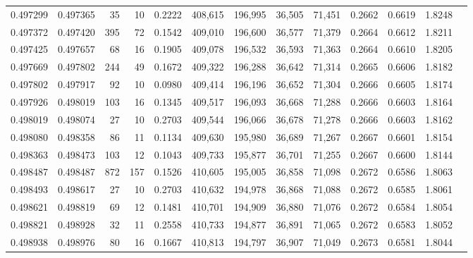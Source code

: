 \begin{tabular}{rrrrrrrrrrrrr}
0.497299 & 0.497365 &    35 &  10 &                                     0.2222 & 408,615 & 196,995 &  36,505 &  71,451 & 0.2662 & 0.6619 & 1.8248 \\
0.497372 & 0.497420 &   395 &  72 &                                     0.1542 & 409,010 & 196,600 &  36,577 &  71,379 & 0.2664 & 0.6612 & 1.8211 \\
0.497425 & 0.497657 &    68 &  16 &                                     0.1905 & 409,078 & 196,532 &  36,593 &  71,363 & 0.2664 & 0.6610 & 1.8205 \\
0.497669 & 0.497802 &   244 &  49 &                                     0.1672 & 409,322 & 196,288 &  36,642 &  71,314 & 0.2665 & 0.6606 & 1.8182 \\
0.497802 & 0.497917 &    92 &  10 &                                     0.0980 & 409,414 & 196,196 &  36,652 &  71,304 & 0.2666 & 0.6605 & 1.8174 \\
0.497926 & 0.498019 &   103 &  16 &                                     0.1345 & 409,517 & 196,093 &  36,668 &  71,288 & 0.2666 & 0.6603 & 1.8164 \\
0.498019 & 0.498074 &    27 &  10 &                                     0.2703 & 409,544 & 196,066 &  36,678 &  71,278 & 0.2666 & 0.6603 & 1.8162 \\
0.498080 & 0.498358 &    86 &  11 &                                     0.1134 & 409,630 & 195,980 &  36,689 &  71,267 & 0.2667 & 0.6601 & 1.8154 \\
0.498363 & 0.498473 &   103 &  12 &                                     0.1043 & 409,733 & 195,877 &  36,701 &  71,255 & 0.2667 & 0.6600 & 1.8144 \\
0.498487 & 0.498487 &   872 & 157 &                                     0.1526 & 410,605 & 195,005 &  36,858 &  71,098 & 0.2672 & 0.6586 & 1.8063 \\
0.498493 & 0.498617 &    27 &  10 &                                     0.2703 & 410,632 & 194,978 &  36,868 &  71,088 & 0.2672 & 0.6585 & 1.8061 \\
0.498621 & 0.498819 &    69 &  12 &                                     0.1481 & 410,701 & 194,909 &  36,880 &  71,076 & 0.2672 & 0.6584 & 1.8054 \\
0.498821 & 0.498928 &    32 &  11 &                                     0.2558 & 410,733 & 194,877 &  36,891 &  71,065 & 0.2672 & 0.6583 & 1.8052 \\
0.498938 & 0.498976 &    80 &  16 &                                     0.1667 & 410,813 & 194,797 &  36,907 &  71,049 & 0.2673 & 0.6581 & 1.8044 \\

\end{tabular}
